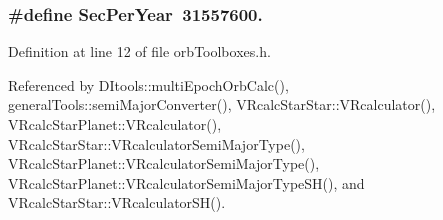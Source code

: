 \subsubsection[{Sec\-Per\-Year}]{\setlength{\rightskip}{0pt plus 5cm}\#define Sec\-Per\-Year~31557600.}\label{orb_toolboxes_8h_a6d6e19125fe7f31962a34db2a378113d}


Definition at line 12 of file orb\-Toolboxes.\-h.



Referenced by D\-Itools\-::multi\-Epoch\-Orb\-Calc(), general\-Tools\-::semi\-Major\-Converter(), V\-Rcalc\-Star\-Star\-::\-V\-Rcalculator(), V\-Rcalc\-Star\-Planet\-::\-V\-Rcalculator(), V\-Rcalc\-Star\-Star\-::\-V\-Rcalculator\-Semi\-Major\-Type(), V\-Rcalc\-Star\-Planet\-::\-V\-Rcalculator\-Semi\-Major\-Type(), V\-Rcalc\-Star\-Planet\-::\-V\-Rcalculator\-Semi\-Major\-Type\-S\-H(), and V\-Rcalc\-Star\-Star\-::\-V\-Rcalculator\-S\-H().

